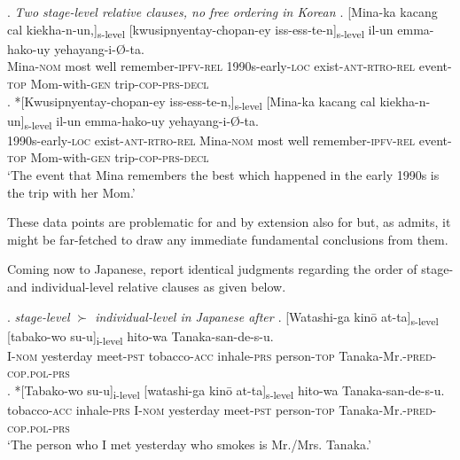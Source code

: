 \newpage
\ex. \emph{Two stage-level relative clauses, no free ordering in Korean \citep[86]{kim:2019:syntax}} \label{s-skorean}
\ag. [Mina-ka kacang cal kiekha-n-un,]\textsubscript{s-level} [kwusipnyentay-chopan-ey iss-ess-te-n]\textsubscript{s-level} il-un emma-hako-uy yehayang-i-Ø-ta.\\
Mina-\textsc{nom} most well remember-\textsc{ipfv-rel} 1990s-early-\textsc{loc} exist-\textsc{ant-rtro-rel} event-\textsc{top} Mom-with-\textsc{gen} trip-\textsc{cop-prs-decl}\\
\bg. *[Kwusipnyentay-chopan-ey iss-ess-te-n,]\textsubscript{s-level} [Mina-ka kacang cal kiekha-n-un]\textsubscript{s-level} il-un emma-hako-uy yehayang-i-Ø-ta.\\
1990s-early-\textsc{loc} exist-\textsc{ant-rtro-rel} Mina-\textsc{nom} most well remember-\textsc{ipfv-rel} event-\textsc{top} Mom-with-\textsc{gen} trip-\textsc{cop-prs-decl}\\
`The event that Mina remembers the best which happened in the early 1990s is the trip with her Mom.'

These data points are problematic for \citet{larson:2004:order} and by extension also for \citet{cinque:2020:relcl} but, as \citet{kim:2019:syntax} admits, it might be far-fetched to draw any immediate fundamental conclusions from them.

Coming now to Japanese, \citet[102]{larson:2004:order} report identical judgments regarding the order of stage- and individual-level relative clauses as given below.

\ex. \label{sijapa} \emph{stage-level $\succ$ individual-level in Japanese after \citet[102]{larson:2004:order}}
\ag. [Watashi-ga kinō at-ta]\textsubscript{s-level} [tabako-wo su-u]\textsubscript{i-level} hito-wa Tanaka-san-de-s-u.\\
I-\textsc{nom} yesterday meet-\textsc{pst} tobacco-\textsc{acc} inhale-\textsc{prs} person-\textsc{top} Tanaka-Mr.-\textsc{pred-cop.pol-prs}\\
\bg. *[Tabako-wo su-u]\textsubscript{i-level} [watashi-ga kinō at-ta]\textsubscript{s-level} hito-wa Tanaka-san-de-s-u.\\
tobacco-\textsc{acc} inhale-\textsc{prs} I-\textsc{nom} yesterday meet-\textsc{pst} person-\textsc{top} Tanaka-Mr.-\textsc{pred-cop.pol-prs}\\
`The person who I met yesterday who smokes is Mr./Mrs. Tanaka.'

